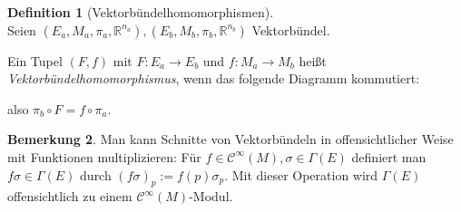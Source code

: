 \documentclass[a4paper]{scrreprt}
\numberwithin{equation}{chapter}
\newcommand{\R}{\mathbb{R}}
\newcommand{\sC}{\mathcal{C}^{\infty}}
\theoremstyle{definition}
\newtheorem{defn}{Definition}[section]
\newtheorem{bem}[defn]{Bemerkung}
\begin{document}
		\begin{defn}[Vektorbündelhomomorphismen]\hfill\\
			Seien $(E_a,M_a,\pi_a,\R^{n_a}),(E_b,M_b,\pi_b,\R^{n_b})$ Vektorbündel.
			
			Ein Tupel $(F,f)$ mit $F\colon E_a\rightarrow E_b$ und $f\colon M_a\rightarrow M_b$ heißt \emph{Vektorbündelhomomorphismus}, wenn das folgende Diagramm kommutiert:
			\begin{center}
			\end{center}
			also $\pi_b\circ F=f\circ\pi_a$.
		\end{defn}
		
		
		\begin{bem}
			Man kann Schnitte von Vektorbündeln in offensichtlicher Weise mit Funktionen multiplizieren: Für $f \in \sC(M), \sigma \in \Gamma(E)$ definiert man $f\sigma \in \Gamma(E)$ durch $(f\sigma)_p := f(p) \sigma_p$. Mit dieser Operation wird $\Gamma(E)$ offensichtlich zu einem $\sC(M)$-Modul.
		\end{bem}
\end{document}

